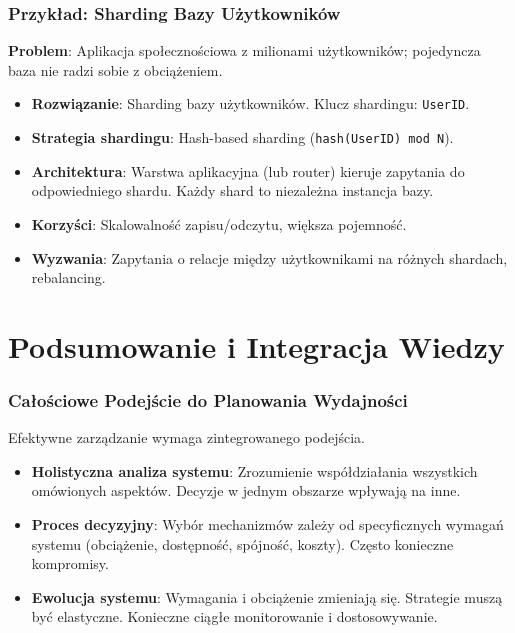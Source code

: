 \documentclass[aspectratio=169,xcolor=table]{beamer}
\begin{document}
\begin{frame}
  \frametitle{Przykład: Sharding Bazy Użytkowników}
  \textbf{Problem}: Aplikacja społecznościowa z milionami użytkowników; pojedyncza baza nie radzi sobie z obciążeniem.
  \begin{itemize}
    \item \textbf{Rozwiązanie}: Sharding bazy użytkowników. Klucz shardingu: \texttt{UserID}.
    \item \textbf{Strategia shardingu}: Hash-based sharding (\texttt{hash(UserID) mod N}).
    \item \textbf{Architektura}: Warstwa aplikacyjna (lub router) kieruje zapytania do odpowiedniego shardu. Każdy shard to niezależna instancja bazy.
    \item \textbf{Korzyści}: Skalowalność zapisu/odczytu, większa pojemność.
    \item \textbf{Wyzwania}: Zapytania o relacje między użytkownikami na różnych shardach, rebalancing.
  \end{itemize}
\end{frame}

\section{Podsumowanie i Integracja Wiedzy}

\begin{frame}
  \frametitle{Całościowe Podejście do Planowania Wydajności}
  Efektywne zarządzanie wymaga zintegrowanego podejścia.
  \begin{itemize}
    \item \textbf{Holistyczna analiza systemu}: Zrozumienie współdziałania wszystkich omówionych aspektów. Decyzje w jednym obszarze wpływają na inne.
    \item \textbf{Proces decyzyjny}: Wybór mechanizmów zależy od specyficznych wymagań systemu (obciążenie, dostępność, spójność, koszty). Często konieczne kompromisy.
    \item \textbf{Ewolucja systemu}: Wymagania i obciążenie zmieniają się. Strategie muszą być elastyczne. Konieczne ciągłe monitorowanie i dostosowywanie.
  \end{itemize}
\end{frame}
\end{document}
